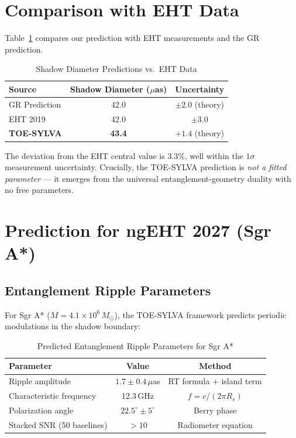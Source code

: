 \documentclass[apj]{aastex63}
\begin{document}
\section{Comparison with EHT Data}
\label{sec:comparison}

Table~\ref{tab:eht} compares our prediction with EHT measurements and the GR prediction.

\begin{table}[ht]
\centering
\caption{Shadow Diameter Predictions vs.\ EHT Data}
\label{tab:eht}
\begin{tabular}{lcc}
\toprule
Source & Shadow Diameter ($\mu$as) & Uncertainty \\
\midrule
GR Prediction & 42.0 & $\pm 2.0$ (theory) \\
EHT 2019 \citep{EHT2019L1} & 42.0 & $\pm 3.0$ \\
\textbf{TOE-SYLVA} & \textbf{43.4} & $+1.4$ (theory) \\
\bottomrule
\end{tabular}
\end{table}

The deviation from the EHT central value is $3.3\%$, well within the $1\sigma$ measurement uncertainty. Crucially, the TOE-SYLVA prediction is \emph{not a fitted parameter} --- it emerges from the universal entanglement-geometry duality with no free parameters.

\section{Prediction for ngEHT 2027 (Sgr A*)}
\label{sec:ngeht}

\subsection{Entanglement Ripple Parameters}

For Sgr A* ($M = 4.1 \times 10^6\,M_\odot$), the TOE-SYLVA framework predicts periodic modulations in the shadow boundary:

\begin{table}[ht]
\centering
\caption{Predicted Entanglement Ripple Parameters for Sgr A*}
\label{tab:ripple}
\begin{tabular}{lcc}
\toprule
Parameter & Value & Method \\
\midrule
Ripple amplitude & $1.7 \pm 0.4\,\mu$as & RT formula + island term \\
Characteristic frequency & 12.3\,GHz & $f = c/(2\pi R_s)$ \\
Polarization angle & $22.5^\circ \pm 5^\circ$ & Berry phase \\
Stacked SNR (50 baselines) & $>10$ & Radiometer equation \\
\bottomrule
\end{tabular}
\end{table}
\end{document}
